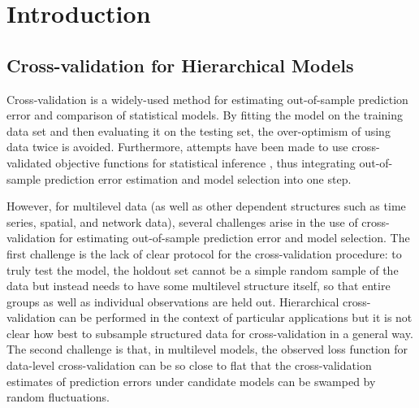 \documentclass[sii]{ipart}
\begin{document}



\section{Introduction}


\subsection{Cross-validation for Hierarchical Models}

Cross-validation is a widely-used method for estimating out-of-sample prediction
error and comparison of statistical models. By fitting the model on the training data set and
then evaluating it on the testing set, the over-optimism of using data twice is
avoided. Furthermore,
attempts have been made to use cross-validated objective functions for
statistical inference \citep{craven1978smoothing, seeger2008cross}, thus
integrating out-of-sample prediction error estimation and model selection into
one step.

However, for multilevel data (as well as other dependent structures such as time
series, spatial, and network data), several challenges arise in the use of
cross-validation for estimating out-of-sample prediction error and model
selection. The first challenge is the lack of clear protocol for the
cross-validation procedure: to truly test the model, the holdout set cannot be a
simple random sample of the data but instead needs to have some multilevel
structure itself, so that entire groups as well as individual observations are
held out.  Hierarchical cross-validation can be performed in the context of
particular applications \citep{PriceGelmanNero:1996} but it is not clear how best
to subsample structured data for cross-validation in a general way.  The second
challenge is that, in multilevel models, the observed loss function for
data-level cross-validation can be so close to flat that the cross-validation
estimates of prediction errors under candidate models can be swamped by random
fluctuations.
\end{document}
